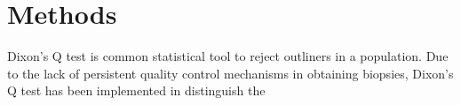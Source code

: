 \chapter{Methods}

Dixon's Q test is common statistical tool to reject outliners in a population. Due to the lack of persistent quality control mechanisms in obtaining biopsies, Dixon's Q test has been implemented in distinguish the 